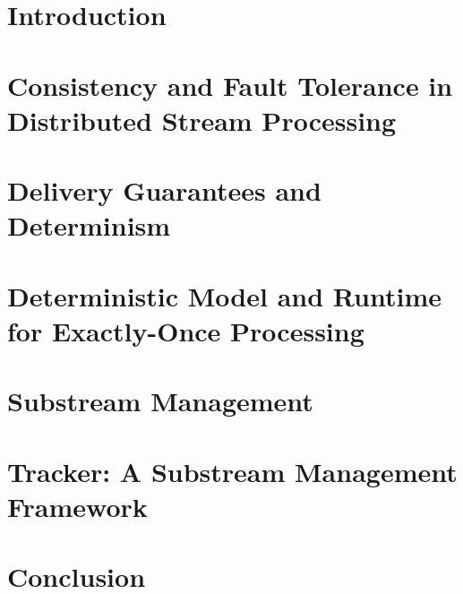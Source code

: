 \documentclass[a4paper, 12pt, twoside]{Thesis}  %
\theoremstyle{definition}
\begin{document}
\chapter{Introduction}

\chapter{Consistency and Fault Tolerance in Distributed Stream Processing}
\label{thesis-chapter-literature-review}


\chapter{Delivery Guarantees and Determinism}
\label{thesis-chapter-delivery-guarantees}


\chapter{Deterministic Model and Runtime for Exactly-Once Processing}
\label{thesis-chapther-optimistic}


\chapter{Substream Management}
\label{thesis-chapter-substreams-consistency}


\chapter{Tracker: A Substream Management Framework}
\label{thesis-chapter-tracker}


\chapter{Conclusion}
\label{thesis-chapter-conclusion}

\end{document}
